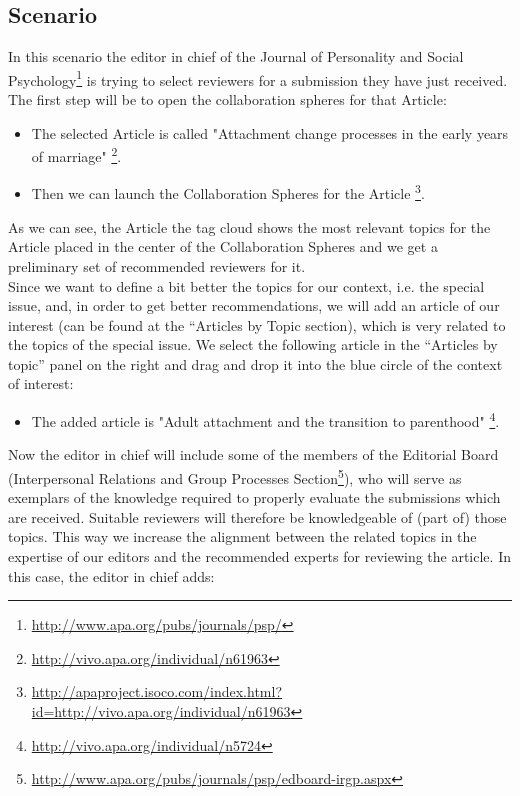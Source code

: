\subsection{Scenario}
In this scenario the editor in chief of the Journal of Personality and Social Psychology\footnote{\url{http://www.apa.org/pubs/journals/psp/}} is trying to select reviewers for a submission they have just received. The first step will be to open the collaboration spheres for that Article: 
\begin{itemize}
  \item The selected Article is called "Attachment change processes in the early years of marriage" \footnote{\url{http://vivo.apa.org/individual/n61963}}.
  \item Then we can launch the Collaboration Spheres for the Article \footnote{\url{http://apaproject.isoco.com/index.html?id=http://vivo.apa.org/individual/n61963}}.
\end{itemize}
As we can see, the Article the tag cloud shows the most relevant topics for the Article placed in the center of the Collaboration Spheres and we get a preliminary set of recommended reviewers for it.\\
Since we want to define a bit better the topics for our context, i.e. the special issue, and, in order to get better recommendations, we will add an article of our interest (can be found at the “Articles by Topic section), which is very related to the topics of the special issue. We select the following article in the “Articles by topic” panel on the right and drag and drop it into the blue circle of the context of interest:
\begin{itemize}
  \item The added article is "Adult attachment and the transition to parenthood" \footnote{\url{http://vivo.apa.org/individual/n5724}}.
\end{itemize}
Now the editor in chief will include some of the members of the Editorial Board (Interpersonal Relations and Group Processes Section\footnote{\url{http://www.apa.org/pubs/journals/psp/edboard-irgp.aspx}}), who will serve as exemplars of the knowledge required to properly evaluate the submissions which are received. Suitable reviewers will therefore be knowledgeable of (part of) those topics. This way we increase the alignment between the related topics in the expertise of our editors and the recommended experts for reviewing the article. In this case, the editor in chief adds:
